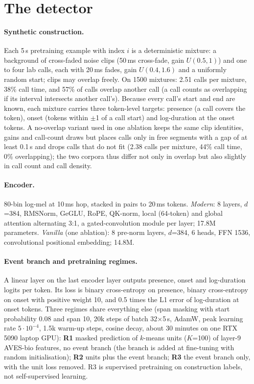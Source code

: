 \documentclass[10pt,twocolumn]{article}
\begin{document}
\section{The detector}
\label{sec:method}
\paragraph{Synthetic construction.} Each 5\,s pretraining example with index $i$ is a deterministic mixture: a background of cross-faded noise clips (50\,ms cross-fade, gain $U(0.5,1)$) and one to four lab calls, each with 20\,ms fades, gain $U(0.4,1.6)$ and a uniformly random start; clips may overlap freely. On 1500 mixtures: 2.51 calls per mixture, 38\% call time, and 57\% of calls overlap another call (a call counts as overlapping if its interval intersects another call's). Because every call's start and end are known, each mixture carries three token-level targets: presence (a call covers the token), onset (tokens within $\pm$1 of a call start) and log-duration at the onset tokens. A no-overlap variant used in one ablation keeps the same clip identities, gains and call-count draws but places calls only in free segments with a gap of at least 0.1\,s and drops calls that do not fit (2.38 calls per mixture, 44\% call time, 0\% overlapping); the two corpora thus differ not only in overlap but also slightly in call count and call density.
\paragraph{Encoder.} 80-bin log-mel at 10\,ms hop, stacked in pairs to 20\,ms tokens. \emph{Modern}: 8 layers, $d$=384, RMSNorm, GeGLU, RoPE, QK-norm, local (64-token) and global attention alternating 3:1, a gated-convolution module per layer; 17.8M parameters. \emph{Vanilla} (one ablation): 8 pre-norm layers, $d$=384, 6 heads, FFN 1536, convolutional positional embedding; 14.8M.
\paragraph{Event branch and pretraining regimes.} A linear layer on the last encoder layer outputs presence, onset and log-duration logits per token. Its loss is binary cross-entropy on presence, binary cross-entropy on onset with positive weight 10, and 0.5 times the L1 error of log-duration at onset tokens. Three regimes share everything else (span masking with start probability 0.08 and span 10, 20k steps of batch 32$\times$5\,s, AdamW, peak learning rate $5\cdot10^{-4}$, 1.5k warm-up steps, cosine decay, about 30 minutes on one RTX 5090 laptop GPU): \textbf{R1} masked prediction of $k$-means units ($K$=100) of layer-9 AVES-bio features, no event branch (the branch is added at fine-tuning with random initialisation); \textbf{R2} units plus the event branch; \textbf{R3} the event branch only, with the unit loss removed. R3 is supervised pretraining on construction labels, not self-supervised learning.
\end{document}
